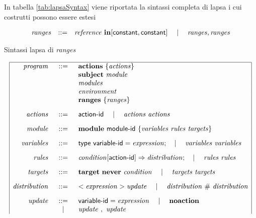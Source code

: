 In tabella \ref{tab:lapsaSyntax} viene riportata la sintassi completa di \ac{lapsa} i cui costrutti possono essere estesi 

\begin{table}[htbp!] %
$$
\begin{array}{rcl}
	\mathit{ranges} &::=& \mathit{reference} \mbox{ } \mathbf{in} [{\sf constant}, {\sf constant}] \quad\mid\quad \mathit{ranges}, \mathit{ranges} \\
\end{array}
$$
\caption{Sintassi \ac{lapsa} di \emph{ranges}}
\label{tab:lapsaRanges}
\end{table}

\begin{table}[htbp!] %
$$
	\begin{array}{|rcl|}
	\hline
	\mathit{program} &::=& \mathbf{actions} \Space \{ \mathit{actions} \} \\
		&& \mathbf{subject} \Space \mathit{module} \\
		&& \mathit{modules} \\
		&& \mathit{environment} \\
		&& \mathbf{ranges} \Space \{ \mathit{ranges} \} 
	\\[.3cm]
	\mathit{actions} &::=& \x{action}\textrm{-}\x{id} \Sep \mathit{actions} \Space \mathit{actions} 
	\\[.3cm]
	\mathit{module} &::=& \mathbf{module} \Space \x{module}\textrm{-}\x{id} \Space \{ \mathit{variables} \Space \mathit{rules} \Space \mathit{targets} \}
	\\[.3cm]
	\mathit{variables} &::=& \x{type} \Space \x{variable}\textrm{-}\x{id} = \mathit{expression}; \Sep \mathit{variables} \Space \mathit{variables}
	\\[.3cm]
	\mathit{rules} &::=& \mathit{condition} [ \x{action}\textrm{-}\x{id}] \Rightarrow \mathit{distribution}; \Sep \mathit{rules} \Space \mathit{rules}
	\\[.3cm]
	\mathit{targets} &::=& \mathbf{target} \Space \mathbf{never} \Space \mathit{condition} \Sep \mathit{targets} \Space \mathit{targets} 
	\\[.3cm]
	\mathit{distribution} &::=& <\mathit{expression}> \mathit{update} \Sep \mathit{distribution} \Space \# \Space \mathit{distribution} 
	\\[.3cm]
	\mathit{update} &::=& \x{variable}\textrm{-}\x{id} = \mathit{expression} \Sep \mathbf{noaction} \\
		& \Sep & \mathit{update} \Space , \Space \mathit{update} 

\end{array}$$
\end{table}
